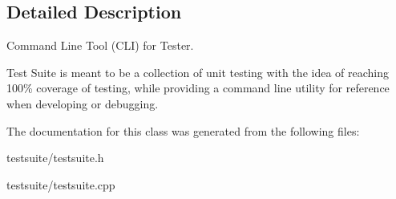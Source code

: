 \subsection{Detailed Description}
Command Line Tool (C\+LI) for Tester. 

Test Suite is meant to be a collection of unit testing with the idea of reaching 100\% coverage of testing, while providing a command line utility for reference when developing or debugging. 

The documentation for this class was generated from the following files\+:\begin{DoxyCompactItemize}
\item 
testsuite/testsuite.\+h\item 
testsuite/testsuite.\+cpp\end{DoxyCompactItemize}
